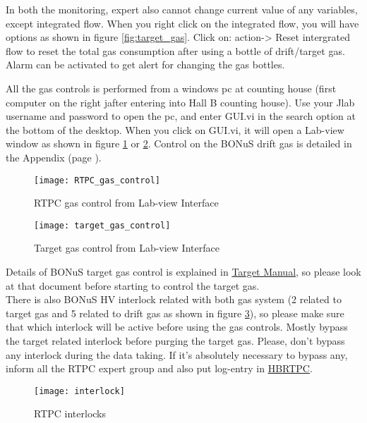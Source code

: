 In both the monitoring, expert also cannot change current value of any variables, except integrated flow. When you right click on the integrated flow, you will have options as shown in figure \ref{fig:target_gas}. Click on: action-> Reset intergrated flow to reset the total gas consumption after using a bottle of drift/target gas. Alarm can be activated to get alert for changing the gas bottles.

All the gas controls is performed from a windows pc at counting house (first computer on the right jafter entering into Hall B counting house). Use your Jlab username and password to open the pc, and enter GUI.vi in the search option at the bottom of the desktop. When you click on GUI.vi, it will open a Lab-view window as shown in figure \ref{fig:rtpc_gas_control} or \ref{fig:target_gas_control}. Control on the BONuS drift gas is detailed in the Appendix (page \pageref{appedix}).

\begin{figure}[H]
	\centering
	\texttt{[image: RTPC\_gas\_control]}
	\caption{RTPC gas control from Lab-view Interface}
	\label{fig:rtpc_gas_control}
\end{figure}


\begin{figure}[H]
	\centering
	\texttt{[image: target\_gas\_control]}
	\caption{Target gas control from Lab-view Interface}
	\label{fig:target_gas_control}
\end{figure}

Details of BONuS target gas control is explained in \href{https://wiki.jlab.org/clas12-run/images/a/ac/BONuS_Target_Gas_System_Manual.pdf}{Target Manual}, so please look at that document before starting to control the target gas.\\

There is also BONuS HV interlock related with both gas system (2 related to target gas and 5 related to drift gas as shown in figure \ref{fig:interlock}), so please make sure that which interlock will be active before using the gas controls. Mostly bypass the target related interlock before purging the target gas. Please, don't bypass any interlock  during the data taking. If it's absolutely necessary to bypass any, inform all the RTPC expert group and also put log-entry in \href{https://logbooks.jlab.org/book/hbrtpc}{HBRTPC}.

\begin{figure}[H]
	\centering
	\texttt{[image: interlock]}
	\caption{RTPC interlocks}
	\label{fig:interlock}
\end{figure}


